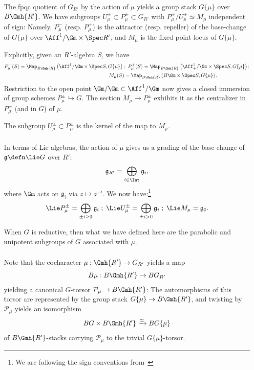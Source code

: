 \documentclass[10pt]{amsart}
\begin{document}
\subsubsection{}
The fpqc quotient of $G_{R'}$ by the action of $\mu$ yields a group stack $G\{\mu\}$ over $B\Gmh{R'}$. We have subgroups $U_\mu^{\pm}\subset P_{\mu}^{\pm} \subset G_{R'}$ with $P_{\mu}^{\pm}/U_\mu^{\pm}\simeq M_\mu$ independent of sign: Namely, $P_{\mu}^-$ (resp. $P_{\mu}^+$) is the attractor (resp. repeller) of the base-change of $G\{\mu\}$ over $\Aff^1/\Gm\times\Spec R'$, and $M_\mu$ is the fixed point locus of $G\{\mu\}$.  

Explicitly, given an $R'$-algebra $S$, we have
\begin{align*}
P_{\mu}^-(S) = \Map_{B\Gmh{R}}\left(\Aff^1/\Gm\times \Spec S,G\{\mu\}\right)\;&;\;  P_{\mu}^+(S) = \Map_{B\Gmh{R}}\left(\Aff^1_+/\Gm\times \Spec S,G\{\mu\}\right);\\
M_\mu(S) &= \Map_{B\Gmh{R}}\left(B\Gm\times\Spec S,G\{\mu\}\right).
\end{align*}
Restriction to the open point $\Gm/\Gm\subset \Aff^1/\Gm$ now gives a closed immersion of group schemes $P^{\pm}_\mu\hookrightarrow G$. The section $M_\mu\to P_\mu^{\pm}$ exhibits it as the centralizer in $P_\mu^{\pm}$ (and in $G$) of $\mu$.

The subgroup $U_\mu^{\pm}\subset P_\mu^{\pm}$ is the kernel of the map to $M_\mu$.


\subsubsection{}
In terms of Lie algebras, the action of $\mu$ gives us a grading of the base-change of $\mathfrak{g} \defn \Lie G$ over $R'$:
\[
\mathfrak{g}_{R'} = \bigoplus_{i\in \Int}\mathfrak{g}_i,
\]
where $\Gm$ acts on $\mathfrak{g}_i$ via $z\mapsto z^{-i}$. We now have:\footnote{We are following the sign conventions from~\cite{MR4355476}}
\[
\Lie P^{\pm}_\mu = \bigoplus_{\pm i\ge 0}\mathfrak{g}_i\;;\; \Lie U^\pm_\mu = \bigoplus_{\pm i>0}\mathfrak{g}_i\;;\; \Lie M_\mu = \mathfrak{g}_0.
\]

When $G$ is reductive, then what we have defined here are the parabolic and unipotent subgroups of $G$ associated with $\mu$.



\subsubsection{}
\label{subsubsec:BGmu_equivalence}
Note that the cocharacter $\mu:\Gmh{R'}\to G_{R'}$ yields a map
\[
B\mu:B\Gmh{R'}\to BG_{R'}
\]
yielding a canonical $G$-torsor $\mathcal{P}_\mu\to B\Gmh{R'}$: The automorphisms of this torsor are represented by the group stack $G\{\mu\}\to B\Gmh{R'}$, and twisting by $\mathcal{P}_\mu$ yields an isomorphism
\[
BG\times B\Gmh{R'}\xrightarrow{\simeq}BG\{\mu\}
\]
of $B\Gmh{R'}$-stacks carrying $\mathcal{P}_\mu$ to the trivial $G\{\mu\}$-torsor.
\end{document}
